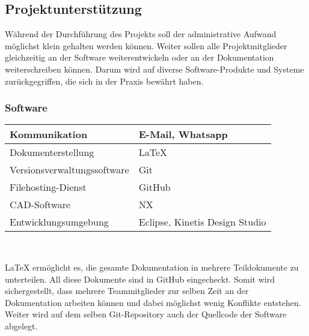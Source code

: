 \subsection{Projektunterstützung}
Während der Durchführung des Projekts soll der administrative Aufwand möglichst klein gehalten werden können. Weiter sollen alle Projektmitglieder gleichzeitig an der Software weiterentwickeln oder an der Dokumentation weiterschreiben können. Darum wird auf diverse Software-Produkte und Systeme zurückgegriffen, die sich in der Praxis bewährt haben.

\subsubsection{Software}
\begin{table}[H]
\begin{tabular}{|p{}|p{}|}\hline
	
Kommunikation	&	E-Mail, Whatsapp \\\hline
Dokumenterstellung & LaTeX\\\hline
Versionsverwaltungssoftware & Git \\\hline
Filehosting-Dienst & GitHub \\\hline
CAD-Software & NX\\\hline
Entwicklungsumgebung	& Eclipse, Kinetis Design Studio \\\hline

\end{tabular}\\
\end{table}
LaTeX ermöglicht es, die gesamte Dokumentation in mehrere Teildokumente zu unterteilen. All diese Dokumente sind in GitHub eingecheckt. Somit wird sichergestellt, dass mehrere Teammitglieder zur selben Zeit an der Dokumentation arbeiten können und dabei möglichst wenig Konflikte entstehen. Weiter wird auf dem selben Git-Repository auch der Quellcode der Software abgelegt.